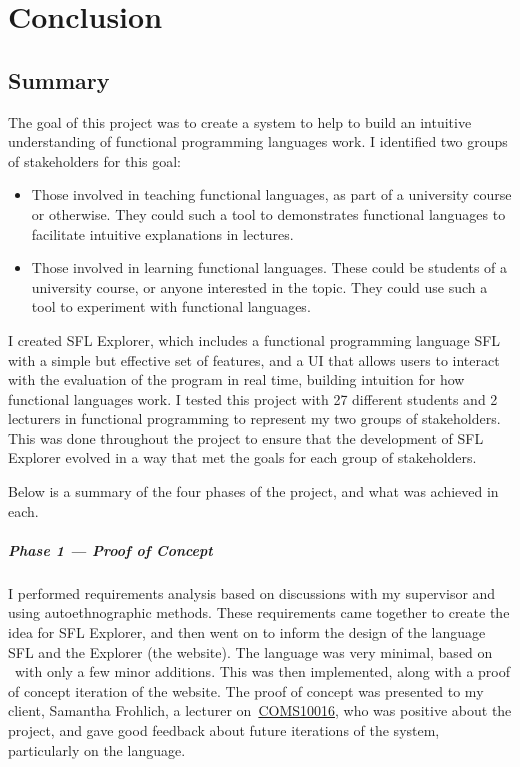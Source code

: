 \chapter{Conclusion}
\label{chap:conclusion}
\section{Summary}
The goal of this project was to create a system to help to build an intuitive understanding of functional programming languages work. I identified two groups of stakeholders for this goal:

\begin{itemize}
    \item Those involved in teaching functional languages, as part of a university course or otherwise. They could such a tool to demonstrates functional languages to facilitate intuitive explanations in lectures.
    \item Those involved in learning functional languages. These could be students of a university course, or anyone interested in the topic. They could use such a tool to experiment with functional languages. 
\end{itemize}

\noindent I created SFL Explorer, which includes a functional programming language \ac{SFL} with a simple but effective set of features, and a UI that allows users to interact with the evaluation of the program in real time, building intuition for how functional languages work. I tested this project with 27 different students and 2 lecturers in functional programming to represent my two groups of stakeholders. This was done throughout the project to ensure that the development of SFL Explorer  evolved in a way that met the goals for each group of stakeholders. 

Below is a summary of the four phases of the project, and what was achieved in each. 
\paragraph{Phase 1 --- Proof of Concept} I performed requirements analysis based on discussions with my supervisor and using autoethnographic methods. These requirements came together to create the idea for SFL Explorer, and then went on to inform the design of the language \ac{SFL} and the Explorer (the website). The language was very minimal, based on \lcalc~with only a few minor additions. This was then implemented, along with a proof of concept iteration of the website. The proof of concept was presented to my client, Samantha Frohlich, a lecturer on~\hyperref[COMS10016]{COMS10016}, who was positive about the project, and gave good feedback about future iterations of the system, particularly on the language. 
